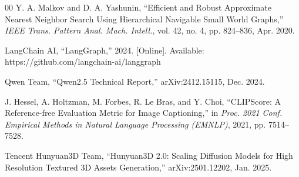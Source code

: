 \documentclass[conference]{IEEEtran}
\begin{document}
\begin{thebibliography}{00}
 Y. A. Malkov and D. A. Yashunin, ``Efficient and Robust Approximate Nearest Neighbor Search Using Hierarchical Navigable Small World Graphs,'' \emph{IEEE Trans. Pattern Anal. Mach. Intell.}, vol. 42, no. 4, pp. 824--836, Apr. 2020.

 LangChain AI, ``LangGraph,'' 2024. [Online]. Available: https://github.com/langchain-ai/langgraph

 Qwen Team, ``Qwen2.5 Technical Report,'' arXiv:2412.15115, Dec. 2024.

 J. Hessel, A. Holtzman, M. Forbes, R. Le Bras, and Y. Choi, ``CLIPScore: A Reference-free Evaluation Metric for Image Captioning,'' in \emph{Proc. 2021 Conf. Empirical Methods in Natural Language Processing (EMNLP)}, 2021, pp. 7514--7528.

 Tencent Hunyuan3D Team, ``Hunyuan3D 2.0: Scaling Diffusion Models for High Resolution Textured 3D Assets Generation,'' arXiv:2501.12202, Jan. 2025.

\end{thebibliography}
\end{document}
